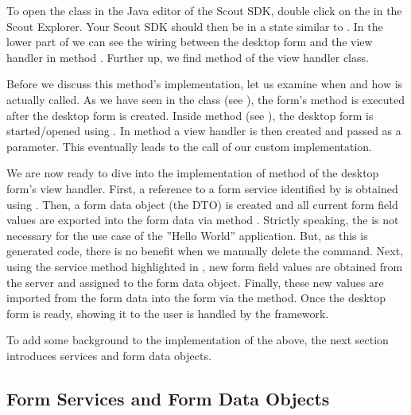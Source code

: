 \documentclass[a4paper,10pt,twoside]{book}
\begin{document}
To open the  class in the Java editor of the Scout SDK, double click on the  in the Scout Explorer.
Your Scout SDK should then be in a state similar to .
In the lower part of  we can see the wiring between the desktop form and the view handler in method .
Further up, we find method  of the view handler class.

Before we discuss this method's implementation, let us examine when and how  is actually called.
As we have seen in the  class (see ), the form's method  is executed after the desktop form is created.
Inside method  (see ), the desktop form is started/opened using .
In method  a view handler is then created and passed as a parameter.
This eventually leads to the call of our  custom implementation.

We are now ready to dive into the implementation of method  of the desktop form's view handler.
First, a reference to a form service identified by  is obtained using .
Then, a form data object (the DTO) is created and all current form field values are exported into the form data via method .
Strictly speaking, the  is not necessary for the use case of the ''Hello World'' application.
But, as this is generated code, there is no benefit when we manually delete the  command.
Next, using the  service method highlighted in , new form field values are obtained from the server and assigned to the form data object.
Finally, these new values are imported from the form data into the form via the  method.
Once the desktop form is ready, showing it to the user is handled by the framework.

To add some background to the implementation of the  above, the next section introduces services and form data objects. 

\subsection{Form Services and Form Data Objects}
\end{document}

